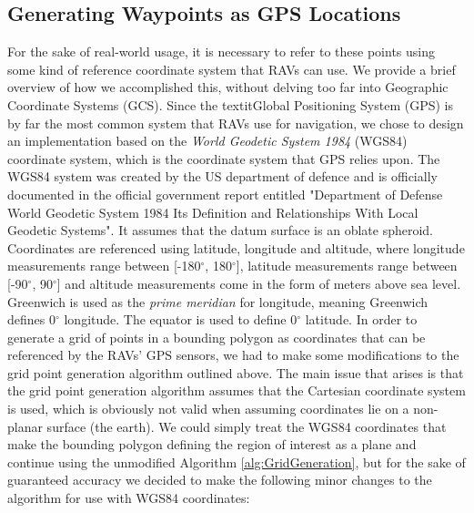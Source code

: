 



\subsection{Generating Waypoints as GPS Locations}
For the sake of real-world usage, it is necessary to refer to these points using some kind of reference coordinate system that RAVs can use. We provide a brief overview of how we accomplished this, without delving too far into Geographic Coordinate Systems (GCS). Since the textit{Global Positioning System} (GPS) is by far the most common system that RAVs use for navigation, we chose to design an implementation based on the \textit{World Geodetic System 1984} (WGS84) coordinate system, which is the coordinate system that GPS relies upon. The WGS84 system was created by the US department of defence and is officially documented in the official government report entitled "Department of Defense World Geodetic System 1984 Its Definition and Relationships With Local Geodetic Systems". It assumes that the datum surface is an oblate spheroid.
Coordinates are referenced using latitude, longitude and altitude, where longitude measurements range between [-180$^{\circ}$, 180$^{\circ}$], latitude measurements range between [-90$^{\circ}$, 90$^{\circ}$] and altitude measurements come in the form of meters above sea level. Greenwich is used as the \textit{prime meridian} for longitude, meaning Greenwich defines 0$^{\circ}$ longitude. The equator is used to define 0$^{\circ}$ latitude. In order to generate a grid of points in a bounding polygon as coordinates that can be referenced by the RAVs' GPS sensors, we had to make some modifications to the grid point generation algorithm outlined above. The main issue that arises is that the grid point generation algorithm assumes that the Cartesian coordinate system is used, which is obviously not valid when assuming coordinates lie on a  non-planar surface (the earth). We could simply treat the WGS84 coordinates that make the bounding polygon defining the region of interest as a plane and continue using the unmodified Algorithm \ref{alg:GridGeneration}, but for the sake of guaranteed accuracy we decided to make the following minor changes to the algorithm for use with WGS84 coordinates:
